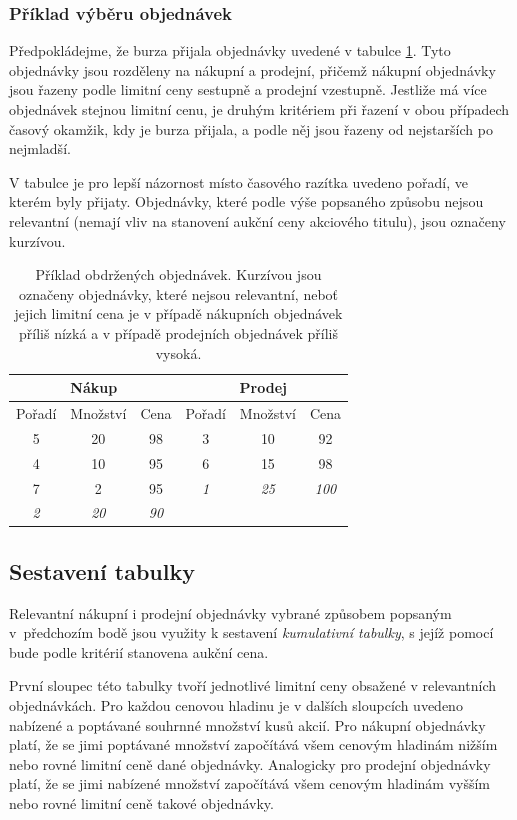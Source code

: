 \documentclass[thesis=M,czech]{FITthesis}[2012/06/26]
\begin{document}
\subsubsection{Příklad výběru objednávek}

Předpokládejme, že burza přijala objednávky uvedené v tabulce \ref{tab:buysellorders}. Tyto objednávky jsou rozděleny 
na nákupní a prodejní, přičemž nákupní objednávky jsou řazeny podle limitní ceny sestupně a prodejní vzestupně. Jestliže
má více objednávek stejnou limitní cenu, je druhým kritériem při řazení v obou případech časový okamžik, kdy je burza přijala,
a podle něj jsou řazeny od nejstarších po nejmladší. 

V tabulce je pro lepší názornost místo časového razítka uvedeno pořadí, ve kterém byly přijaty. Objednávky, které podle výše 
popsaného způsobu nejsou relevantní (nemají vliv na stanovení aukční ceny akciového titulu), jsou označeny kurzívou.

\begin{table}\centering
	\begin{tabular}{|c|c|c||c|c|c|}\hline
		\multicolumn{3}{|c||}{Nákup}  & \multicolumn{3}{c|}{Prodej} \tabularnewline \hline 
		Pořadí	 	& Množství	& Cena	& Pořadí	& Množství	& Cena	\tabularnewline \hline \hline
		5		& 20		& 98		& 3		& 10		& 92		\tabularnewline \hline
		4		& 10		& 95		& 6		& 15		& 98		\tabularnewline \hline
		7		& 2		& 95		& \textit{1}	& \textit{25} & \textit{100} \tabularnewline \hline
		\textit{2}	& \textit{20} & \textit{90} & 		& 		& 		\tabularnewline \hline
	\end{tabular}
	\caption[Příklad obdržených objednávek]{Příklad obdržených objednávek. Kurzívou jsou označeny objednávky, které 
		nejsou relevantní, neboť jejich limitní cena je v případě nákupních objednávek příliš nízká a v případě
		prodejních objednávek příliš vysoká.}
	\label{tab:buysellorders}
\end{table}


\subsection{Sestavení tabulky}

Relevantní nákupní i prodejní objednávky vybrané způsobem popsaným v~předchozím bodě jsou využity k sestavení 
\textit{kumulativní tabulky}, s jejíž pomocí bude podle kritérií stanovena aukční cena.

První sloupec této tabulky tvoří jednotlivé limitní ceny obsažené v relevantních objednávkách. Pro každou cenovou hladinu je 
v dalších sloupcích uvedeno nabízené a poptávané souhrnné množství kusů akcií. Pro nákupní objednávky platí, 
že se jimi poptávané množství započítává všem cenovým hladinám nižším nebo rovné limitní ceně dané objednávky. Analogicky 
pro prodejní objednávky platí, že se jimi nabízené množství započítává všem cenovým hladinám vyšším nebo rovné limitní ceně 
takové objednávky.
\end{document}
